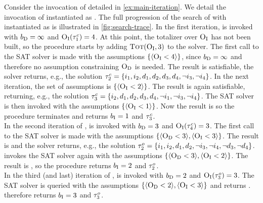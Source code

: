 \begin{example}\label{ex:satunsat}
  Consider the invocation of \algname{} detailed in \cref{ex:main-iteration}. 
  We detail the invocation of \Min{} instantiated as \satunsat{}. 
  The full progression of the search of \algname{} with \Min{} instantiated as \satunsat{} is illustrated in \cref{fig:search-trace}.
  In the first iteration, \satunsat{} is invoked with $b_{\text{D}} = \infty$ and $\textsc{O}_{\text{I}}(\tau^c_1) = 4$.
  At this point, the totalizer over $\textsc{O}_{\text{I}}$ has not been built, so the procedure starts by adding $\textsc{Tot}(\textsc{O}_{\text{I}}, 3)$ to the solver.
  The first call to the SAT solver is made with the assumptions $\{\langle \textsc{O}_{\text{I}} < 4 \rangle\}$, since $b_{\text{D}} = \infty$ and therefore no assumption constraining $\textsc{O}_{\text{D}}$ is needed.
  The result is satisfiable, the solver returns, e.g., the solution $\tau^c_2 = \{i_1,\allowbreak i_2,\allowbreak d_1,\allowbreak d_2,\allowbreak d_3,\allowbreak d_4,\allowbreak \lnot i_3,\allowbreak \lnot i_4\}$. 
  In the next iteration, the set of assumptions is $\{\langle \textsc{O}_{\text{I}} < 2 \rangle\}$.
  The result is again satisfiable, returning, e.g., the solution $\tau^c_3 = \{i_2,\allowbreak d_1,\allowbreak d_2,\allowbreak d_3,\allowbreak d_4,\allowbreak \lnot i_1,\allowbreak \lnot i_3,\allowbreak \lnot i_4\}$.
  The SAT solver is then invoked with the assumptions $\{\langle \textsc{O}_{\text{I}} < 1 \rangle\}$.
  Now the result is \unsat{} so the procedure terminates and returns $b_{\text{I}} = 1$ and $\tau^c_3$. \\
  In the second iteration of \algname{}, \satunsat{} is invoked with $b_{\text{D}} = 3$ and $\textsc{O}_{\text{I}}(\tau^c_4) = 3$.
  The first call to the SAT solver is made with the assumptions $\{ \langle \textsc{O}_{\text{D}} < 3 \rangle, \langle \textsc{O}_{\text{I}} < 3 \rangle \}$.
  The result is \sat{} and the solver returns, e.g., the solution $\tau^o_2 = \{i_1,\allowbreak i_2,\allowbreak d_1,\allowbreak d_2,\allowbreak \lnot i_3,\allowbreak \lnot i_4,\allowbreak \lnot d_3,\allowbreak \lnot d_4\}$.
  \satunsat{} invokes the SAT solver again with the assumptions $\{ \langle \textsc{O}_{\text{D}} < 3 \rangle, \langle \textsc{O}_{\text{I}} < 2 \rangle \}$.
  The result is \unsat{}, so the procedure returns $b_{\text{I}} = 2$ and $\tau^o_2$. \\
  In the third (and last) iteration of \algname{}, \satunsat{} is invoked with $b_{\text{D}} = 2$ and $\textsc{O}_{\text{I}}(\tau^o_3) = 3$.
  The SAT solver is queried with the assumptions $\{ \langle \textsc{O}_{\text{D}} < 2 \rangle, \langle \textsc{O}_{\text{I}} < 3 \rangle \}$ and returns \unsat{}.
  \satunsat{} therefore returns $b_{\text{I}} = 3$ and $\tau^o_3$.
\end{example}

\subsection{\unsatsat{}\label{sec:unsat-sat}}

